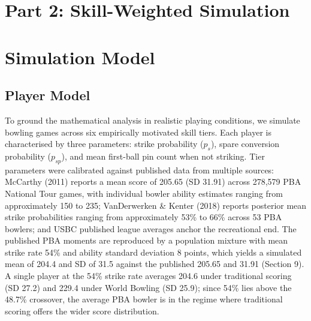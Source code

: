 \documentclass[
  letterpaper,
  DIV=11,
  numbers=noendperiod]{scrartcl}
\begin{document}
\section*{Part 2: Skill-Weighted
Simulation}\label{part-2-skill-weighted-simulation}

\section{Simulation Model}\label{simulation-model}

\subsection{Player Model}\label{player-model}

To ground the mathematical analysis in realistic playing conditions, we
simulate bowling games across six empirically motivated skill tiers.
Each player is characterised by three parameters: strike probability
(\(p_s\)), spare conversion probability (\(p_{sp}\)), and mean
first-ball pin count when not striking. Tier parameters were calibrated
against published data from multiple sources: McCarthy (2011) reports a
mean score of 205.65 (SD 31.91) across 278,579 PBA National Tour games,
with individual bowler ability estimates ranging from approximately 150
to 235; VanDerwerken \& Kenter (2018) reports posterior mean strike
probabilities ranging from approximately 53\% to 66\% across 53 PBA
bowlers; and USBC published league averages anchor the recreational end.
The published PBA moments are reproduced by a population mixture with
mean strike rate 54\% and ability standard deviation 8 points, which
yields a simulated mean of 204.4 and SD of 31.5 against the published
205.65 and 31.91 (Section 9). A single player at the 54\% strike rate
averages 204.6 under traditional scoring (SD 27.2) and 229.4 under World
Bowling (SD 25.9); since 54\% lies above the 48.7\% crossover, the
average PBA bowler is in the regime where traditional scoring offers the
wider score distribution.
\end{document}
